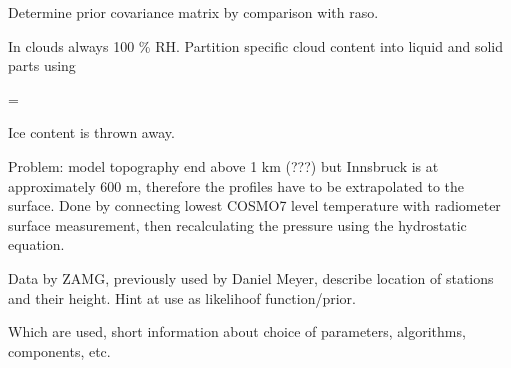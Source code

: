     Determine prior covariance matrix by comparison with raso.

    In clouds always 100 \% RH. Partition specific cloud content into liquid
    and solid parts using

    \startformula
        \QLIQ = \QCLOUD \startcases
              \KELVIN \le \TEMP \NR
            \NC \frac{\TEMP - 233.15 \KELVIN}{40 \KELVIN}
                 \KELVIN \lt \TEMP {} \KELVIN \NR
              \KELVIN \le \TEMP \NR
        \stopcases
    \stopformula

    Ice content is thrown away.

    Problem: model topography end above 1 km (???) but Innsbruck is at
    approximately 600 m, therefore the profiles have to be extrapolated to the
    surface. Done by connecting lowest COSMO7 level temperature with radiometer
    surface measurement, then recalculating the pressure using the hydrostatic
    equation.

\stopsection


\startsection[title={Nordkette Slope Measurements}]

    Data by ZAMG, previously used by Daniel Meyer, describe location of
    stations and their height. Hint at use as likelihoof function/prior.

\stopsection


\startsection[title={Applied Retrieval techniques}]

    Which are used, short information about choice of parameters, algorithms,
    components, etc.

\stopsection

